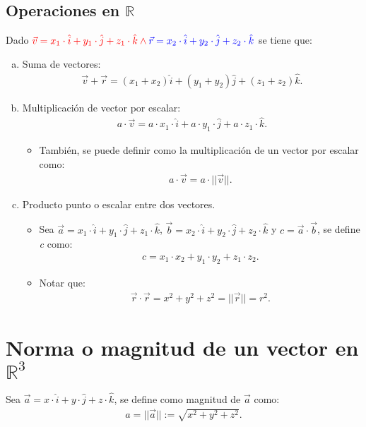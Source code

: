 \documentclass[12pt]{article}
\begin{document}
\subsection{Operaciones en $\mathbb{R}$}
Dado $\color{red}\vec{v}=x_1 \cdot\hat{i}+ y_1\cdot \hat{j} + z_1 \cdot \hat{k} \land \color{blue}\vec{r}=x_2 \cdot\hat{i}+ y_2\cdot \hat{j} + z_2 \cdot \hat{k} \color{black}$ se tiene que:
	\begin{enumerate}[a), leftmargin=2cm]
		\item Suma de vectores:
			\begin{align*}
				\vec{v} + \vec{r}=(x_1+x_2)\hat{i}+(y_1+y_2)\hat{j}+(z_1+z_2)\hat{k}.
			\end{align*}
		\item Multiplicación de vector por escalar:
			\begin{align*}
				a \cdot \vec{v}= a\cdot x_1 \cdot \hat{i} + a \cdot y_1 \cdot \hat{j} + a \cdot z_1 \cdot \hat{k}.
			\end{align*}
				\begin{itemize}
					\item También, se puede definir como la multiplicación de un vector por escalar como:
						\begin{align*}
						a \cdot \vec{v}  = a \cdot || \vec{v} ||.
						\end{align*}
				\end{itemize}
		\item Producto punto o escalar entre dos vectores.
			\begin{itemize}
				\item Sea $\vec{a} =x_{1} \cdot \hat{i} +y_{1} \cdot \hat{j} + z_{1} \cdot \hat{k}$, $\vec{b} = x_{2} \cdot \hat{i} + y_{2} \cdot \hat{j} + z_{2} \cdot \hat{k}$ y $c = \vec{a} \cdot \vec{b}$, se define \emph{c} como: 
					\begin{align*}
						c = x_{1} \cdot x_{2} + y_{1} \cdot y_{2} + z_{1} \cdot z_{2}.
					\end{align*}
				\item Notar que:
					\begin{align*}
						\vec{r} \cdot \vec{r} = x^{2} + y^{2} + z^{2} = || \vec{r} || = r^{2}.
					\end{align*}
			\end{itemize}
	\end{enumerate}
\section{Norma o magnitud de un vector en $\mathbb{R}^{3}$}
Sea $\vec{a} = x \cdot \hat{i} + y \cdot \hat{j}  + z \cdot \hat{k}$, se define como magnitud de $\vec{a}$ como: 
	\begin{align*}
		a=||\vec{a}|| := \sqrt{x^{2} + y^{2} + z^{2}}.
	\end{align*}
\end{document}
